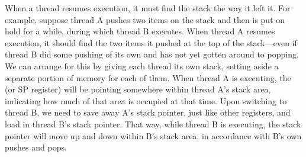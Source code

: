 When a thread resumes execution, it must find the stack
the way it left it.  For example, suppose thread A pushes two items on the
stack and then is put on hold for a while, during which thread B executes.
When thread A resumes execution, it should find the two items it pushed at
the top of the stack---even if thread B did some pushing of its own
and has not yet gotten around to popping.  We can arrange for this by
giving each thread its own stack, setting aside a separate portion of
memory for each of them.  When thread A is executing, the  (or SP register) will be pointing somewhere within thread A's
stack area, indicating how much of that area is occupied at that time.
Upon switching to thread B, we need to save away A's stack pointer,
just like other registers, and load in thread B's stack pointer.  That
way, while thread B is executing, the stack pointer will move up and
down within B's stack area, in accordance with B's own pushes and
pops.

